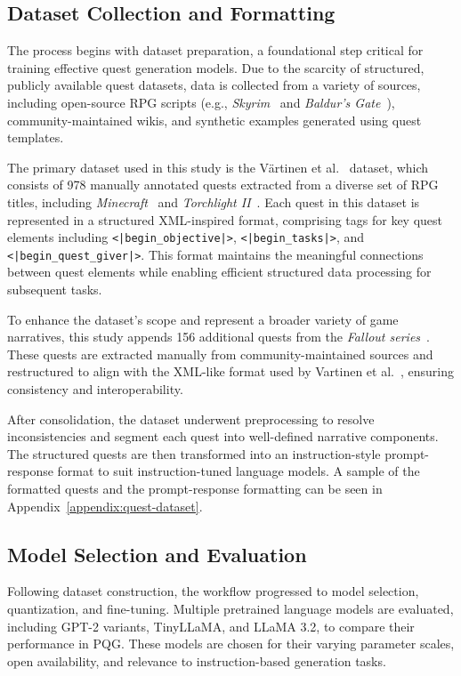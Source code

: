 \subsection{Dataset Collection and Formatting}

The process begins with dataset preparation, a foundational step critical for training
effective quest generation models. Due to the scarcity of structured, publicly available
quest datasets, data is collected from a variety of sources, including open-source RPG
scripts (e.g., \textit{Skyrim}~\cite{theelderscrollsvskyrim} and \textit{Baldur's Gate}~\cite{baldursgate}), community-maintained wikis, and synthetic
examples generated using quest templates.

The primary dataset used in this study is the V{\"a}rtinen et al.~\cite{vartinen2022generating} dataset, which
consists of 978 manually annotated quests extracted from a diverse set of RPG titles,
including \textit{Minecraft}~\cite{minecraft} and \textit{Torchlight II}~\cite{torchlightii}. Each quest in this dataset is represented
in a structured XML-inspired format, comprising tags for key quest elements including
\texttt{<|begin\_objective|>}, \texttt{<|begin\_tasks|>}, and \texttt{<|begin\_quest\_giver|>}. This format
maintains the meaningful connections between quest elements while enabling efficient
structured data processing for subsequent tasks.

To enhance the dataset's scope and represent a broader variety of game narratives, this
study appends 156 additional quests from the \textit{Fallout series}~\cite{fallout1,fallout2}. These quests are extracted
manually from community-maintained sources and restructured to align with the
XML-like format used by Vartinen et al.~\cite{vartinen2022generating}, ensuring consistency and interoperability.

After consolidation, the dataset underwent preprocessing to resolve inconsistencies
and segment each quest into well-defined narrative components. The structured quests
are then transformed into an instruction-style prompt-response format to suit instruction-tuned
language models. A sample of the formatted quests and the prompt-response
formatting can be seen in Appendix~\ref{appendix:quest-dataset}.

\subsection{Model Selection and Evaluation}

Following dataset construction, the workflow progressed to model selection, quantization,
and fine-tuning. Multiple pretrained language models are evaluated, including
GPT-2 variants, TinyLLaMA, and LLaMA 3.2, to compare their performance in PQG.
These models are chosen for their varying parameter scales, open availability, and relevance
to instruction-based generation tasks.

